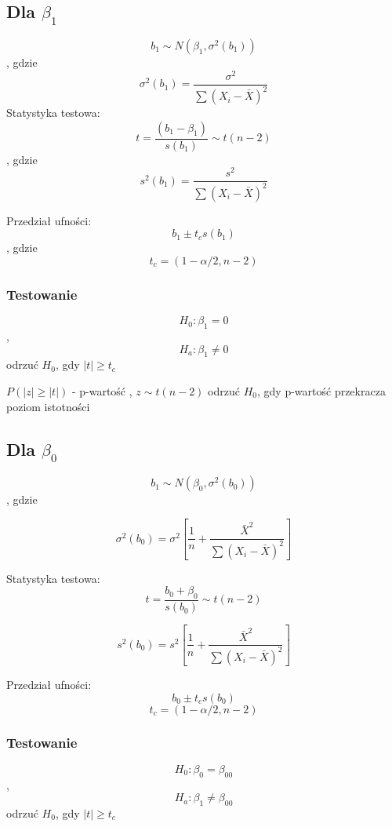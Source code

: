 \documentclass[9pt]{article}  %
\begin{document}
    \subsection{ Dla $\beta_1$ }
    
    $$b_1 \sim N(\beta_1, \sigma^2(b_1)) $$ , gdzie
    $$\sigma^2(b_1) = \frac{\sigma^2}{\sum{\left(X_i - \bar{X}\right)^2 }}$$
    Statystyka testowa:
    $$ t = \frac{ \left(b_1 - \beta_1 \right) }{ s(b_1) } \sim t(n-2)$$
    , gdzie 
    $$s^2(b_1) = \frac{s^2}{\sum{\left(X_i - \bar{X}\right)^2}}$$

    Przedział ufności:
    $$ b_1 \pm t_c s(b_1)$$, gdzie
    $$ t_c = (1-\alpha /2, n-2)$$
    
    \subsubsection{Testowanie}
    
    $$H_0 : \beta_1 = 0$$, $$H_a : \beta_1 \ne 0$$
    odrzuć $H_0$, gdy $|t| \ge t_c$

    

    $P(|z| \ge |t|)$ - p-wartość , $z \sim t(n-2)$ \newline
    odrzuć $H_0$, gdy p-wartość przekracza poziom istotności
    
    
    \subsection{ Dla $\beta_0$ }
    
      $$b_1 \sim N(\beta_0, \sigma^2(b_0)) $$, gdzie
    
    $$\sigma^2(b_0) = \sigma^2 \left[ \frac{1}{n} + \frac{\bar{X}^2}{\sum{\left(X_i - \bar{X}\right)^2 }}  \right]$$

  Statystyka testowa: 
  $$t = \frac{b_0+\beta_0}{s(b_0)} \sim t(n-2)$$
  
      $$s^2(b_0) = s^2 \left[ \frac{1}{n} + \frac{\bar{X}^2}{\sum{\left(X_i - \bar{X}\right)^2 }}  \right]$$


  Przedział ufności:
    $$ b_0 \pm t_c s(b_0)$$
    $$ t_c = (1-\alpha /2, n-2)$$
  

    \subsubsection{Testowanie}
    
    $$H_0 : \beta_0 = \beta_{00}$$, $$H_a : \beta_1 \ne \beta_{00}$$
    odrzuć $H_0$, gdy $|t| \ge t_c$
    
\end{document}

